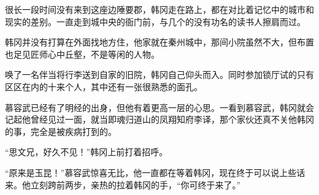 很长一段时间没有来到这座边陲要郡，韩冈走在路上，都在对比着记忆中的城市和现实的差别。一直走到城中央的衙门前，与几个的没有功名的读书人擦肩而过。

韩冈并没有打算在外面找地方住，他家就在秦州城中，那间小院虽然不大，但布置也足见匠师心中丘壑，不是等闲的人物。

唤了一名伴当将行李送到自家的旧院，韩冈自己仰头而入。同时参加锁厅试的只有区区在内的十来个人，其中还有一张很熟悉的面孔。

慕容武已经有了明经的出身，但他有着更高一层的心思。一看到慕容武，韩冈就会记起他曾经见过一面，就当即魂归道山的凤翔知府李译，那个家伙还真不关他韩冈的事，完全是被疾病打到的。

“思文兄，好久不见！”韩冈上前打着招呼。

“原来是玉昆！”慕容武惊喜无比，他一直都在等着韩冈，现在终于可以说上些话来。他立刻跨前两步，亲热的拉着韩冈的手，“你可终于来了。”

